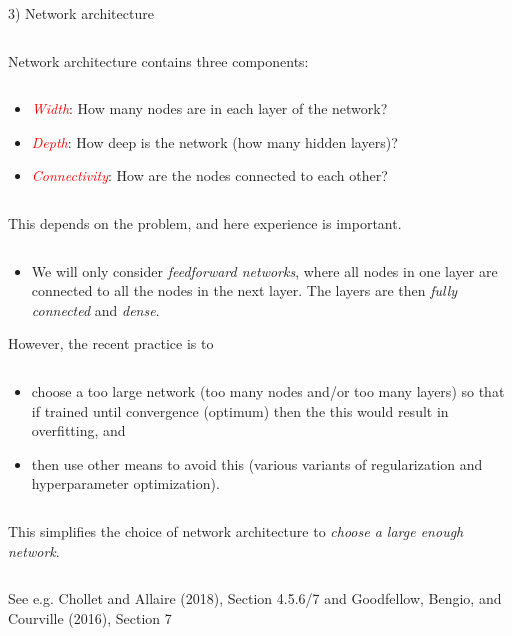 \documentclass[10pt,ignorenonframetext,]{beamer}
\providecommand{\tightlist}{%
  \setlength{\itemsep}{0pt}\setlength{\parskip}{0pt}}
\begin{document}
\begin{frame}

\begin{block}{3) Network architecture}

\(~\)

Network architecture contains three components:

\(~\)

\begin{itemize}
\item
  \emph{\textcolor{red}{Width}}: How many nodes are in each layer of the
  network?
\item
  \emph{\textcolor{red}{Depth}}: How deep is the network (how many
  hidden layers)?
\item
  \emph{\textcolor{red}{Connectivity}}: How are the nodes connected to
  each other?
\end{itemize}

\(~\)

This depends on the problem, and here experience is important.

\(~\)

\begin{itemize}
\tightlist
\item
  We will only consider \emph{feedforward networks}, where all nodes in
  one layer are connected to all the nodes in the next layer. The layers
  are then \emph{fully connected} and \emph{dense}.
\end{itemize}

\end{block}

\end{frame}

\begin{frame}

However, the recent practice is to

\(~\)

\begin{itemize}
\tightlist
\item
  choose a too large network (too many nodes and/or too many layers) so
  that if trained until convergence (optimum) then the this would result
  in overfitting, and
\end{itemize}

\vspace{2mm}

\begin{itemize}
\tightlist
\item
  then use other means to avoid this (various variants of regularization
  and hyperparameter optimization).
\end{itemize}

\(~\)

This simplifies the choice of network architecture to \emph{choose a
large enough network}.

\(~\)

See e.g. Chollet and Allaire (2018), Section 4.5.6/7 and Goodfellow,
Bengio, and Courville (2016), Section 7

\end{frame}
\end{document}
